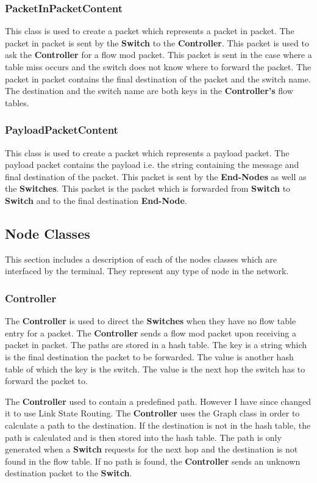 \documentclass{article}
\begin{document}
\subsubsection{PacketInPacketContent}
This class is used to create a packet which represents a packet in packet. The
packet in packet is sent by the \textbf{Switch} to the \textbf{Controller}.
This packet is used to ask the \textbf{Controller} for a flow mod packet. This
packet is sent in the case where a table miss occurs and the switch does not
know where to forward the packet. The packet in packet contains the final
destination of the packet and the switch name. The destination and the switch
name are both keys in the \textbf{Controller's} flow tables.

\subsubsection{PayloadPacketContent}
This class is used to create a packet which represents a payload packet. The
payload packet contains the payload i.e. the string containing the message and
final destination of the packet. This packet is sent by the \textbf{End-Nodes}
as well as the \textbf{Switches}. This packet is the packet which is forwarded
from \textbf{Switch} to \textbf{Switch} and to the final destination
\textbf{End-Node}.

\subsection{Node Classes}
This section includes a description of each of the nodes classes which are
interfaced by the terminal. They represent any type of node in the network.

\subsubsection{Controller}
The \textbf{Controller} is used to direct the \textbf{Switches} when they have
no flow table entry for a packet. The \textbf{Controller} sends a flow mod
packet upon receiving a packet in packet. The paths are stored in a hash table.
The key is a string which is the final destination the packet to be forwarded.
The value is another hash table of which the key is the switch. The value is the
next hop the switch has to forward the packet to.

The \textbf{Controller} used to contain a predefined path. However I have since
changed it to use Link State Routing. The \textbf{Controller} uses the Graph
class in order to calculate a path to the destination. If the destination is not
in the hash table, the path is calculated and is then stored into the hash table.
The path is only generated when a \textbf{Switch} requests for the next hop and
the destination is not found in the flow table. If no path is found, the
\textbf{Controller} sends an unknown destination packet to the \textbf{Switch}.
\end{document}
